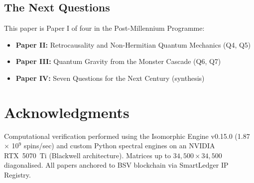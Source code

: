\documentclass[12pt,a4paper]{article}
\theoremstyle{definition}
\theoremstyle{remark}
\begin{document}
\subsection{The Next Questions}

This paper is Paper I of four in the Post-Millennium Programme:
\begin{itemize}
  \item \textbf{Paper II:} Retrocausality and Non-Hermitian Quantum Mechanics
  (Q4, Q5)
  \item \textbf{Paper III:} Quantum Gravity from the Monster Cascade (Q6, Q7)
  \item \textbf{Paper IV:} Seven Questions for the Next Century (synthesis)
\end{itemize}

\section*{Acknowledgments}

Computational verification performed using the Isomorphic Engine v0.15.0
(1.87 $\times$ 10$^9$ spins/sec) and custom Python spectral engines on an
NVIDIA RTX~5070~Ti (Blackwell architecture). Matrices up to $34{,}500 \times
34{,}500$ diagonalised. All papers anchored to BSV blockchain via SmartLedger
IP Registry.
\end{document}

